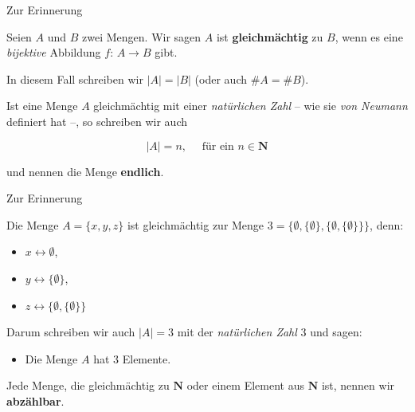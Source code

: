 \documentclass[12pt,ngerman,a4paper,ignorenonframetext,]{beamer}
\providecommand{\tightlist}{%
  \setlength{\itemsep}{0pt}\setlength{\parskip}{0pt}}
\begin{document}
\begin{frame}{Zur Erinnerung}
\protect\hypertarget{zur-erinnerung-1}{}


\begin{definition}[Gleichmächtigkeit]

Seien \(A\) und \(B\) zwei Mengen. Wir sagen \(A\) ist
\textbf{gleichmächtig} zu \(B\), wenn es eine \emph{bijektive} Abbildung
\(f:\, A \to B\) gibt.

In diesem Fall schreiben wir \(|A|= |B|\) (oder auch \(\#A = \#B\)).

\end{definition}


\begin{definition}

Ist eine Menge \(A\) gleichmächtig mit einer \emph{natürlichen Zahl} --
wie sie \emph{von Neumann} definiert hat --, so schreiben wir auch

\begin{equation*}
    |A| = n,\quad \text{ für ein } n \in \mathbf{N}
\end{equation*}

und nennen die Menge \textbf{endlich}.

\end{definition}

\end{frame}

\begin{frame}{Zur Erinnerung}
\protect\hypertarget{zur-erinnerung-2}{}


\begin{Beispiel}

Die Menge \(A=\{x, y, z\}\) ist gleichmächtig zur Menge
\(3=\{ \emptyset, \{ \emptyset \}, \{ \emptyset, \{ \emptyset \} \} \}\),
denn:

\begin{itemize}
\tightlist
\item
  \(\displaystyle x \leftrightarrow \emptyset\),
\item
  \(\displaystyle y \leftrightarrow \{ \emptyset \}\),
\item
  \(\displaystyle z \leftrightarrow \{ \emptyset, \{ \emptyset \} \}\)
\end{itemize}

Darum schreiben wir auch \(|A|=3\) mit der \emph{natürlichen Zahl} 3 und
sagen:

\begin{itemize}
\tightlist
\item
  Die Menge \(A\) hat \(3\) Elemente.
\end{itemize}

\end{Beispiel}


\begin{definition}

Jede Menge, die gleichmächtig zu \(\mathbf{N}\) oder einem Element aus
\(\mathbf{N}\) ist, nennen wir \textbf{abzählbar}.

\end{definition}

\end{frame}
\end{document}
